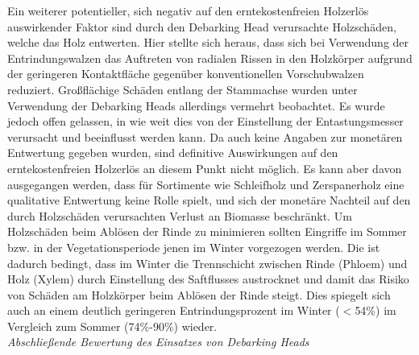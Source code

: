 \documentclass[a4paper, 11pt, titlepage]{scrartcl} %
\begin{document}
Ein weiterer potentieller, sich negativ auf den erntekostenfreien Holzerlös auswirkender Faktor sind durch den Debarking Head verursachte Holzschäden, welche das Holz entwerten. Hier stellte sich heraus, dass sich bei Verwendung der Entrindungswalzen das Auftreten von radialen Rissen in den Holzkörper aufgrund der geringeren Kontaktfläche gegenüber konventionellen Vorschubwalzen reduziert. Großflächige Schäden entlang der Stammachse wurden unter Verwendung der Debarking Heads allerdings vermehrt beobachtet. Es wurde jedoch offen gelassen, in wie weit dies von der Einstellung der Entastungsmesser verursacht und beeinflusst werden kann. Da auch keine Angaben zur monetären Entwertung gegeben wurden, sind definitive Auswirkungen auf den erntekostenfreien Holzerlös an diesem Punkt nicht möglich. Es kann aber davon ausgegangen werden, dass für Sortimente wie Schleifholz und Zerspanerholz eine qualitative Entwertung keine Rolle spielt, und sich der monetäre Nachteil auf den durch Holzschäden verursachten Verlust an Biomasse beschränkt. Um Holzschäden beim Ablösen der Rinde zu minimieren sollten Eingriffe im Sommer bzw. in der Vegetationsperiode jenen im Winter vorgezogen werden. Die ist dadurch bedingt, dass im Winter die Trennschicht zwischen Rinde (Phloem) und Holz (Xylem) durch Einstellung des Saftflusses austrocknet und damit das Risiko von Schäden am Holzkörper beim Ablösen der Rinde steigt. Dies spiegelt sich auch an einem deutlich geringeren Entrindungsprozent im Winter ($<$54\%) im Vergleich zum Sommer (74\%-90\%) wieder.\\


\noindent \textit{Abschließende Bewertung des Einsatzes von Debarking Heads}\\
\end{document}
